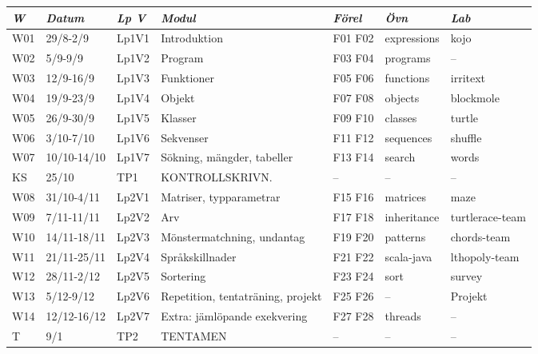 \begin{tabular}{l|l|l|l|l|l|l}
\textit{W} & \textit{Datum} & \textit{Lp V} & \textit{Modul} & \textit{Förel} & \textit{Övn} & \textit{Lab} \\ \hline \hline
W01 & 29/8-2/9 & Lp1V1 & Introduktion & F01 F02 & expressions & kojo \\
W02 & 5/9-9/9 & Lp1V2 & Program & F03 F04 & programs & -- \\
W03 & 12/9-16/9 & Lp1V3 & Funktioner & F05 F06 & functions & irritext \\
W04 & 19/9-23/9 & Lp1V4 & Objekt & F07 F08 & objects & blockmole \\
W05 & 26/9-30/9 & Lp1V5 & Klasser & F09 F10 & classes & turtle \\
W06 & 3/10-7/10 & Lp1V6 & Sekvenser & F11 F12 & sequences & shuffle \\
W07 & 10/10-14/10 & Lp1V7 & Sökning, mängder, tabeller & F13 F14 & search & words \\
KS & 25/10 & TP1 & KONTROLLSKRIVN. & -- & -- & -- \\
W08 & 31/10-4/11 & Lp2V1 & Matriser, typparametrar & F15 F16 & matrices & maze \\
W09 & 7/11-11/11 & Lp2V2 & Arv & F17 F18 & inheritance & turtlerace-team \\
W10 & 14/11-18/11 & Lp2V3 & Mönstermatchning, undantag & F19 F20 & patterns & chords-team \\
W11 & 21/11-25/11 & Lp2V4 & Språkskillnader & F21 F22 & scala-java & lthopoly-team \\
W12 & 28/11-2/12 & Lp2V5 & Sortering & F23 F24 & sort & survey \\
W13 & 5/12-9/12 & Lp2V6 & Repetition, tentaträning, projekt & F25 F26 & -- & Projekt \\
W14 & 12/12-16/12 & Lp2V7 & Extra: jämlöpande exekvering & F27 F28 & threads & -- \\
T & 9/1 & TP2 & TENTAMEN & -- & -- & -- \\
\end{tabular}

